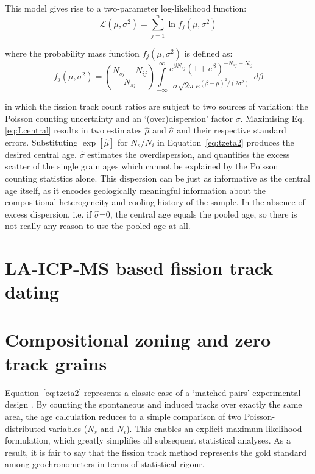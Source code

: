 \begin{refsection}
This model gives rise to a two-parameter log-likelihood function:
\begin{equation}
  \mathcal{L}(\mu,\sigma^2) = \sum\limits_{j=1}^{n}
  \ln f_j(\mu,\sigma^2)
\label{eq:Lcentral}
\end{equation}

\noindent where the probability mass function $f_j(\mu,\sigma^2)$ is
defined as:
\begin{equation}
  f_j(\mu,\sigma^2) = {{N_{sj}+N_{ij}}\choose{N_{sj}}}
  \int\limits_{-\infty}^{\infty} \frac{e^{\beta N_{sj}} \left( 1 +
    e^\beta \right)^{-N_{sj}-N_{ij}}} {\sigma\sqrt{2\pi}
    e^{(\beta-\mu)^2/(2\sigma^2)}} d\beta
  \label{eq:fjms}
\end{equation}

\noindent in which the fission track count ratios are subject to two
sources of variation: the Poisson counting uncertainty and an
`(over)dispersion' factor $\sigma$.  Maximising Eq. \ref{eq:Lcentral}
results in two estimates $\hat{\mu}$ and $\hat{\sigma}$ and their
respective standard errors.  Substituting $\exp[\hat{\mu}]$ for
$N_s/N_i$ in Equation~\ref{eq:tzeta2} produces the desired central
age. $\hat{\sigma}$ estimates the overdispersion, and quantifies the
excess scatter of the single grain ages which cannot be explained by
the Poisson counting statistics alone. This dispersion can be just as
informative as the central age itself, as it encodes geologically
meaningful information about the compositional heterogeneity and
cooling history of the sample.  In the absence of excess dispersion,
i.e. if $\hat{\sigma}$=0, the central age equals the pooled age, so
there is not really any reason to use the pooled age at all.

\section{LA-ICP-MS based fission track dating}
\label{sec:ICPFT}



\section{Compositional zoning and zero track grains}
\label{sec:zerotracks}

Equation~\ref{eq:tzeta2} represents a classic case of a `matched
pairs' experimental design \citep{galbraith2010}. By counting the
spontaneous and induced tracks over exactly the same area, the age
calculation reduces to a simple comparison of two Poisson-distributed
variables ($N_s$ and $N_i$). This enables an explicit maximum
likelihood formulation, which greatly simplifies all subsequent
statistical analyses. As a result, it is fair to say that the fission
track method represents the gold standard among geochronometers in
terms of statistical rigour.\\


\end{refsection}
